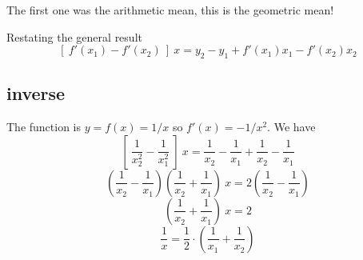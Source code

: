 \documentclass[11pt, oneside]{article}
\begin{document}
The first one was the arithmetic mean, this is the geometric mean!

Restating the general result
\[ [ \ f'(x_1) - f'(x_2) \ ] \ x = y_2 - y_1 + f'(x_1)x_1 - f'(x_2) x_2 \]

\subsection*{inverse}
The function is $y = f(x) = 1/x$ so $f'(x) = -1/x^2$.  We have
\[ [ \ \frac{1}{x_2^2} - \frac{1}{x_1^2} \ ] \ x = \frac{1}{x_2} - \frac{1}{x_1} + \frac{1}{x_2} - \frac{1}{x_1} \]
\[ (\frac{1}{x_2} - \frac{1}{x_1})(\frac{1}{x_2} + \frac{1}{x_1}) \ x = 2 (\frac{1}{x_2} - \frac{1}{x_1})  \]
\[ (\frac{1}{x_2} + \frac{1}{x_1}) \ x = 2 \]
\[ \frac{1}{x} = \frac{1}{2} \cdot (\frac{1}{x_1} + \frac{1}{x_2}) \]
\end{document}
